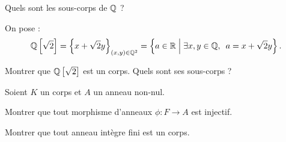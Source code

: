 \begin{exo}[Exercice 20]
Quels sont les sous-corps de \(\mathbb{Q}\) ?
\end{exo}

\begin{corr}
\end{corr}

\begin{exo}[Exercice 21]
On pose : \[\Q\croch{\sqrt{2}}=\accol{x+\sqrt{2}y}_{\paren{x,y}\in\Q^2}=\accol{a\in\R\tq\quantifs{\exists x,y\in\Q}a=x+\sqrt{2}y}.\]

Montrer que \(\mathbb{Q}\left[\sqrt{2}\right]\) est un corps. Quels sont ses sous-corps ?
\end{exo}

\begin{corr}
\end{corr}

\begin{exo}[Exercice 22]
Soient \(K\) un corps et \(A\) un anneau non-nul.

Montrer que tout morphisme d'anneaux \(\phi:F\to A\) est injectif.
\end{exo}

\begin{corr}
\end{corr}

\begin{exo}[Exercice 23]
Montrer que tout anneau intègre fini est un corps.
\end{exo}

\begin{corr}
\end{corr}